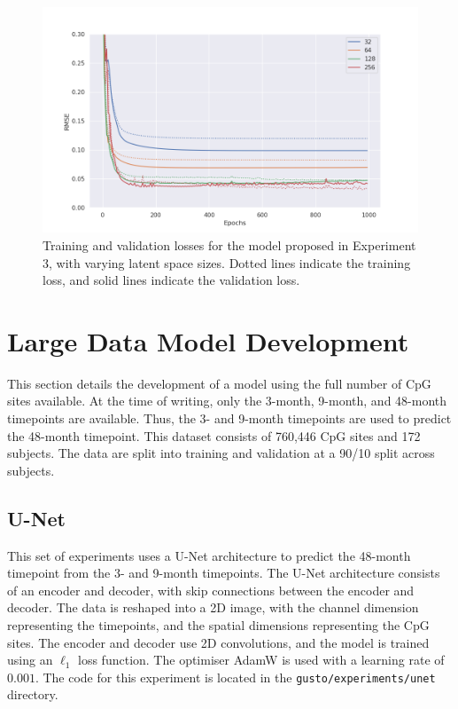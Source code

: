 \documentclass[twocolumn, 9pt]{extarticle}
\begin{document}
\begin{figure}
  \centering
  \includegraphics[width=\columnwidth]{dict_learning_experiments_4.png}
  \caption{Training and validation losses for the model proposed in Experiment 3, with varying latent space sizes. Dotted lines indicate the training loss, and solid lines indicate the validation loss.}
  \label{fig:losses_dict_latent_space}
\end{figure}

\section{Large Data Model Development}

This section details the development of a model using the full number of CpG sites available. At the time of writing, only the 3-month, 9-month, and 48-month timepoints are available. Thus, the 3- and 9-month timepoints are used to predict the 48-month timepoint. This dataset consists of 760,446 CpG sites and 172 subjects. The data are split into training and validation at a 90/10 split across subjects.

\subsection{U-Net}

This set of experiments uses a U-Net architecture to predict the 48-month timepoint from the 3- and 9-month timepoints. The U-Net architecture consists of an encoder and decoder, with skip connections between the encoder and decoder. The data is reshaped into a 2D image, with the channel dimension representing the timepoints, and the spatial dimensions representing the CpG sites. The encoder and decoder use 2D convolutions, and the model is trained using an $\ell_{1}$ loss function. The optimiser AdamW is used with a learning rate of $0.001$. The code for this experiment is located in the \texttt{gusto/experiments/unet} directory.
\end{document}
